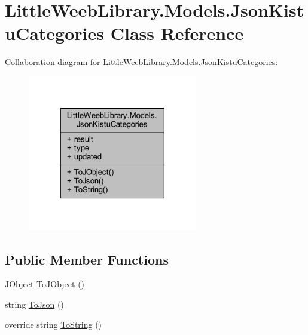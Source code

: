 \hypertarget{class_little_weeb_library_1_1_models_1_1_json_kistu_categories}{}\section{Little\+Weeb\+Library.\+Models.\+Json\+Kistu\+Categories Class Reference}
\label{class_little_weeb_library_1_1_models_1_1_json_kistu_categories}


Collaboration diagram for Little\+Weeb\+Library.\+Models.\+Json\+Kistu\+Categories\+:\nopagebreak
\begin{figure}[H]
\begin{center}
\leavevmode
\includegraphics[width=210pt]{class_little_weeb_library_1_1_models_1_1_json_kistu_categories__coll__graph}
\end{center}
\end{figure}
\subsection*{Public Member Functions}
\begin{DoxyCompactItemize}
\item 
J\+Object \mbox{\hyperlink{class_little_weeb_library_1_1_models_1_1_json_kistu_categories_aa4fa8f73a8a500c0ee4238329c2dd8f8}{To\+J\+Object}} ()
\item 
string \mbox{\hyperlink{class_little_weeb_library_1_1_models_1_1_json_kistu_categories_aaab94c1dc228770f7bf0b66f4a47fd54}{To\+Json}} ()
\item 
override string \mbox{\hyperlink{class_little_weeb_library_1_1_models_1_1_json_kistu_categories_af972fa0332070ba294c5117b95836aa4}{To\+String}} ()
\end{DoxyCompactItemize}
